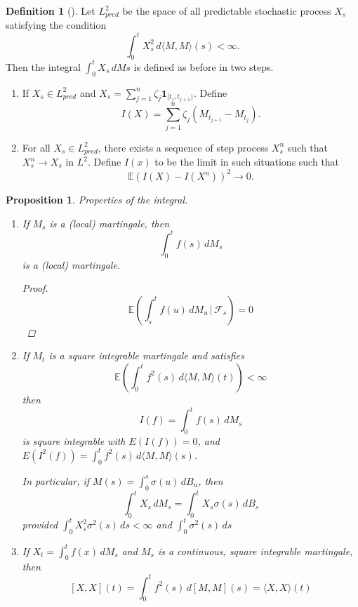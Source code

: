 \documentclass[10pt, oneside, reqno]{amsart}
\theoremstyle{plain}%
\newtheorem{prop}[thm]{Proposition}
\theoremstyle{definition}
\newtheorem{defn}[thm]{Definition}
\theoremstyle{remark}
\newcommand{\given}{ \, | \,}
\newcommand{\E}{\mathbb{E}}
\newcommand{\sigf}{\mathcal{F}}
\begin{document}
\begin{defn}[]
    Let $L^2_{pred}$ be the space of all predictable stochastic process $X_s$ satisfying the condition \[
        \int_0^t X_s^2 \, d \langle M, M \rangle (s) < \infty.
    \] Then the integral $\int_0^t X_s \, dMs$ is defined as before in two steps.
    \begin{enumerate}[(1)]
        \item If $X_s \in L^2_{pred}$ and $X_s = \sum_{j=1}^n \zeta_j \mathbf{1}_{[t_j, t_{j+1})}$.  Define \[
            I(X) = \sum_{j=1}^n \zeta_j (M_{t_{j+1}} - M_{t_j}).
        \] 
        \item For all $X_s \in L^2_{pred}$, there exists a sequence of step process $X_s^n$ such that $X_s^n \rightarrow X_s$ in $L^2$.  Define $I(x)$ to be the limit in such situations such that \[
            \E(I(X) - I(X^n))^2 \rightarrow 0.
        \]
    \end{enumerate}
\end{defn}
\begin{prop}
    Properties of the integral.  
    \begin{enumerate}
        \item If $M_s$ is a (local) martingale, then \[
            \int_0^t f(s) \, dM_s
        \] is a (local) martingale.  
        
        \begin{proof}
            \[
                \E(\int_s^t f(u) \, dM_u \given \sigf_s) = 0
            \]
        \end{proof}
        \item If $M_t$ is a square integrable martingale and satisfies \[
            \E( \int_0^t f^2(s)\,  d\langle M, M\rangle (t) ) < \infty
        \] then \[
            I(f) = \int_0^t f(s) \, dM_s 
        \] is square integrable with $E(I(f)) = 0$, and $E(I^2(f)) = \int_0^t f^2(s) \, d\langle M, M \rangle(s)$. 
        
        In particular, if $M(s) = \int_0^s \sigma(u) \, dB_u$, then \[
            \int_0^t X_s \, dM_s = \int_0^t X_s \sigma(s) \, dB_s
        \] provided $\int_0^t X_s^2 \sigma^2(s) \, ds < \infty$ and $\int_0^t \sigma^2(s) \, ds$
        \item If $X_t = \int_0^t f(x) \, dM_s$ and $M_s$ is a continuous, square integrable martingale, then \[
            [X, X](t) = \int_0^t f^2(s) \, d[M, M](s) = \langle X, X \rangle(t)
        \]
    \end{enumerate}
\end{prop}
\end{document}
